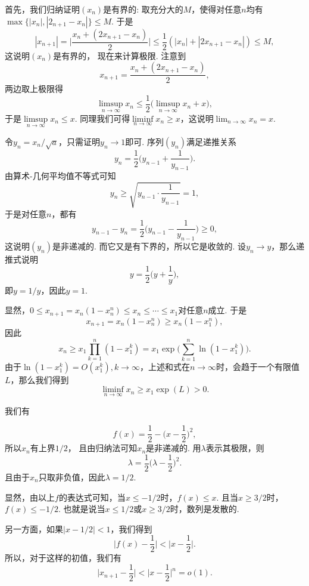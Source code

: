 \begin{ans}
  首先，我们归纳证明$(x_n)$是有界的: 取充分大的$M$，使得对任意$n$均有$\max\{|x_n|,|2_{n+1}-x_n|\}\le M$. 于是
  \[ |x_{n+1}|=\bigg|\frac{x_n+(2x_{n+1}-x_n)}2\bigg|
  \le\frac12(|x_n|+|2x_{n+1}-x_n|)\le M, \]
  这说明$(x_n)$是有界的， 现在来计算极限. 注意到
  \[ x_{n+1}=\frac{x_n+(2x_{n+1}-x_n)}2, \]
  两边取上极限得
  \[ \limsup_{n\to\infty}x_n\le
  \frac12\Big(\limsup_{n\to\infty} x_n+x\Big), \]
  于是$\limsup\limits_{n\to\infty}x_n\le x$. 同理我们可得$\liminf\limits_{n\to\infty}x_n\ge x$，这说明$\lim_{n\to\infty}x_n=x$.

\end{ans}

\begin{ans}
  令$y_n=x_n/\sqrt a$，只需证明$y_n\to1$即可. 序列$(y_n)$满足递推关系
  \[ y_n=\frac12\Big( y_{n-1}+\frac1{y_{n-1}} \Big). \]
  由算术-几何平均值不等式可知
  \[ y_n\ge\sqrt{y_{n-1}\cdot\frac1{y_{n-1}}} =1,\]
  于是对任意$n$，都有
  \[ y_{n-1}-y_n=\frac12\Big( y_{n-1}-\frac1{y_{n-1}} \Big)\ge0, \]
  这说明$(y_n)$是非递减的. 而它又是有下界的，所以它是收敛的. 设$y_n\to y$，那么递推式说明
  \[ y=\frac12\Big(y+\frac1y\Big), \]
  即$y=1/y$，因此$y=1$.
\end{ans}

\begin{ans}
  显然，$0\le x_{n+1}=x_n(1-x_n^n)\le x_n\le\cdots\le x_1$对任意$n$成立. 于是
  \[ x_{n+1}=x_n(1-x_n^n)\ge x_n(1-x_1^n), \]
  因此
  \[ x_n\ge x_1\prod_{k=1}^n(1-x_1^k)=x_1\exp
  \bigg(\sum_{k=1}^n\ln(1-x_1^k)\bigg). \]
  由于$\ln(1-x_1^k)=O(x_1^k),k\to\infty$，上述和式在$n\to\infty$时，会趋于一个有限值$L$，那么我们得到
  \[ \liminf_{n\to\infty} x_n\ge x_1\exp(L)>0. \]
\end{ans}

\begin{ans}
  \begin{enumb}
    \item 我们有
  \end{enumb}
  \[ f(x)=\frac12-\bigg(x-\frac12\bigg)^2, \]
  所以$x_n$有上界$1/2$， 且由归纳法可知$x_n$是非递减的. 用$\lambda$表示其极限，则
  \[ \lambda=\frac12\bigg(\lambda-\frac12\bigg)^2. \]
  且由于$x_n$只取非负值，因此$\lambda=1/2$.
  \begin{enumb}\setcounter{enumi}{1}
    \item 显然，由以上$f$的表达式可知，当$x\le-1/2$时，$f(x)\le x$. 且当$x\ge3/2$时，$f(x)\le-1/2$. 也就是说当$x\le1/2$或$x\ge3/2$时，数列是发散的.
  \end{enumb}

  另一方面，如果$|x-1/2|<1$，我们得到
  \[ \bigg|f(x)-\frac12\bigg|<\bigg|x-\frac12\bigg|. \]
  所以，对于这样的初值，我们有
  \[ \bigg|x_{n+1}-\frac12\bigg|<\bigg|x-\frac12\bigg|^n=o(1). \]
\end{ans}

